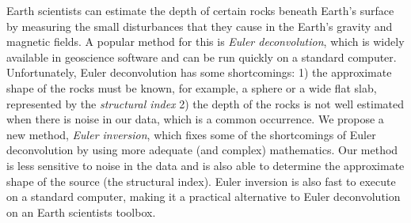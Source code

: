 Earth scientists can estimate the depth of certain rocks beneath Earth's surface by measuring the small disturbances that they cause in the Earth's gravity and magnetic fields.
A popular method for this is \textit{Euler deconvolution}, which is widely available in geoscience software and can be run quickly on a standard computer. 
Unfortunately, Euler deconvolution has some shortcomings: 1) the approximate shape of the rocks must be known, for example, a sphere or a wide flat slab, represented by the \textit{structural index} 2) the depth of the rocks is not well estimated when there is noise in our data, which is a common occurrence.
We propose a new method, \textit{Euler inversion}, which fixes some of the shortcomings of Euler deconvolution by using more adequate (and complex) mathematics.
Our method is less sensitive to noise in the data and is also able to determine the approximate shape of the source (the structural index).
Euler inversion is also fast to execute on a standard computer, making it a practical alternative to Euler deconvolution on an Earth scientists toolbox.